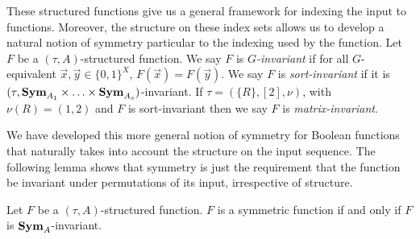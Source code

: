 \documentclass[../paper.tex]{subfiles}
\begin{document}
These structured functions give us a general framework for indexing the input to
functions. Moreover, the structure on these index sets allows us to develop a
natural notion of symmetry particular to the indexing used by the function. Let
$F$ be a $(\tau, A)$-structured function. We say $F$ is \emph{$G$-invariant} if
for all $G$-equivalent $\vec{x},\vec{y} \in \{0,1\}^{X}$, $F(\vec{x}) =
F(\vec{y})$. We say $F$ is \emph{sort-invariant} if it is $(\tau, \text{\textbf{Sym}}_{A_{1}}
\times \ldots \times \text{\textbf{Sym}}_{A_{s}})$-invariant. If $\tau = (\{R\}, [2], \nu)$,
with $\nu (R) = (1, 2)$ and $F$ is sort-invariant then we say $F$ is
\emph{matrix-invariant}.


We have developed this more general notion of symmetry for Boolean functions
that naturally takes into account the structure on the input sequence. The
following lemma shows that symmetry is just the requirement that the function be
invariant under permutations of its input, irrespective of structure.

\begin{lem}
  Let $F$ be a $(\tau, A)$-structured function. $F$ is a symmetric function if
  and only if $F$ is $\text{\textbf{Sym}}_A$-invariant.
\end{lem}




\end{document}
